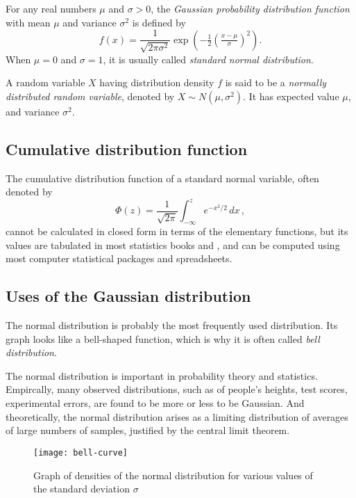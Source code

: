 \documentclass{article}
\begin{document}


For any real numbers $\mu$ and $\sigma > 0$, the
\emph{Gaussian probability distribution function} 
with mean $\mu$ and variance $\sigma^2$ is defined by
\[
f(x) = \frac{1}{\sqrt{2 \pi \sigma^2}} 
\exp \left( - \tfrac12 \left( \tfrac{x - \mu}{\sigma} \right) ^2 \right).
\]
When $\mu=0$ and $\sigma = 1$, 
it is usually called \emph{standard normal distribution}.

A random variable $X$ having distribution density $f$ is said to be a 
\emph{normally distributed random variable}, denoted by $X\sim N(\mu,\sigma^2)$. 
It has expected value $\mu$, 
and variance $\sigma^2$. 

\subsection*{Cumulative distribution function}

The cumulative distribution function of a standard normal variable,
often denoted by
\[
\Phi(z) = \frac{1}{\sqrt{2\pi}} \int_{-\infty}^z e^{-x^2/2} \, dx\,,
\]
cannot be calculated in closed form in terms of the elementary functions,
but its values are tabulated in most statistics books and ,
and can be computed using most computer statistical packages and spreadsheets.

\subsection*{Uses of the Gaussian distribution}

The normal distribution is probably the most frequently used distribution. 
Its graph looks like a bell-shaped function, which is why it is often 
called \emph{bell distribution}. 

The normal distribution is important in probability theory and statistics.
Empircally, many observed distributions, 
such as of people's heights, test scores, 
experimental errors, are found to be more or less to be Gaussian.
And theoretically, the normal distribution arises as a limiting
distribution of averages of large numbers of samples, justified 
by the central limit theorem.

\begin{figure}
\texttt{[image: bell-curve]}
\caption{Graph of densities of the normal 
distribution for various values of the standard deviation $\sigma$}
\end{figure}
\end{document}
